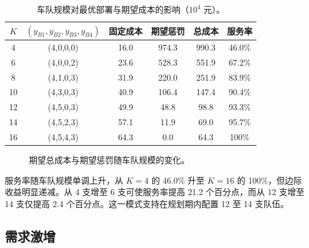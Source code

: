 \documentclass[12pt,a4paper,fontset=windows]{ctexart}
\begin{document}
\begin{table}[!ht]
\centering
\caption{车队规模对最优部署与期望成本的影响（$10^{4}$ 元）。}
\label{tab:fleet}
\small
\begin{tabular}{cccccc}
\toprule
$K$ & $(y_{B1},y_{B2},y_{B3},y_{B4})$ & 固定成本 & 期望惩罚 & 总成本 & 服务率 \\
\midrule
4  & (4,0,0,0) & 16.0 & 974.3 & 990.3 & 46.0\% \\
6  & (4,0,0,2) & 23.6 & 528.3 & 551.9 & 67.2\% \\
8  & (4,1,0,3) & 31.9 & 220.0 & 251.9 & 83.9\% \\
10 & (4,3,0,3) & 40.9 & 106.4 & 147.4 & 90.4\% \\
12 & (4,5,0,3) & 49.9 & 48.8  & 98.8  & 93.3\% \\
14 & (4,5,2,3) & 57.1 & 11.9  & 69.0  & 95.7\% \\
16 & (4,5,4,3) & 64.3 & 0.0   & 64.3  & 100\% \\
\bottomrule
\end{tabular}
\end{table}

\begin{figure}[!ht]
\centering
{}
\caption{期望总成本与期望惩罚随车队规模的变化。}
\label{fig:fleet}
\end{figure}

服务率随车队规模单调上升，从 $K=4$ 的 46.0\% 升至 $K=16$ 的 100\%，但边际收益明显递减。从 4 支增至 6 支可使服务率提高 21.2 个百分点，而从 12 支增至 14 支仅提高 2.4 个百分点。这一模式支持在规划期内配置 12 至 14 支队伍。

\subsection{需求激增}
\end{document}
